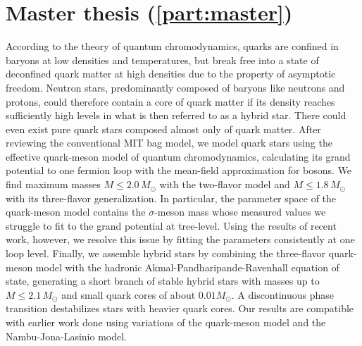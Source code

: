 \section*{Master thesis (\cref{part:master})}

According to the theory of quantum chromodynamics,
quarks are confined in baryons at low densities and temperatures,
but break free into a state of deconfined quark matter at high densities due to the property of asymptotic freedom.
Neutron stars, predominantly composed of baryons like neutrons and protons,
could therefore contain a core of quark matter if its density reaches sufficiently high levels
in what is then referred to as a hybrid star.
There could even exist pure quark stars composed almost only of quark matter.
After reviewing the conventional MIT bag model,
we model quark stars using the effective quark-meson model of quantum chromodynamics,
calculating its grand potential to one fermion loop with the mean-field approximation for bosons.
We find maximum masses $M \leq 2.0 \, M_\odot$ with the two-flavor model and $M \leq 1.8 \, M_\odot$ with its three-flavor generalization.
In particular, the parameter space of the quark-meson model contains the $\sigma$-meson mass whose measured values we struggle to fit to the grand potential at tree-level.
Using the results of recent work, however,
we resolve this issue by fitting the parameters consistently at one loop level.
Finally, we assemble hybrid stars by combining the three-flavor quark-meson model with the hadronic Akmal-Pandharipande-Ravenhall equation of state,
generating a short branch of stable hybrid stars with masses up to $M \leq 2.1 \, M_\odot$ and small quark cores of about $0.01 M_\odot$.
A discontinuous phase transition destabilizes stars with heavier quark cores.
Our results are compatible with earlier work done using variations of the quark-meson model and the Nambu-Jona-Lasinio model.
